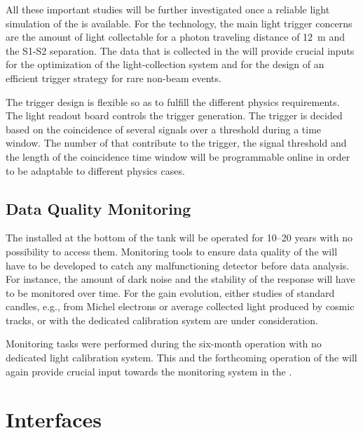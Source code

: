 All these important studies will be further investigated once a reliable light simulation of the  is available. For the \dual  technology, the main light trigger concerns are the amount of light collectable for a photon traveling distance of \SI{12}{m} and the S1-S2 separation. The data that is collected in the  will provide crucial inputs for the optimization of the  light-collection system and for the design of an efficient trigger strategy for rare non-beam events. 

The  trigger design is flexible so as to fulfill the different physics requirements.  %
The light readout  board controls %
the  trigger generation. The trigger is decided based on the coincidence of several  signals over a threshold during a time window. The number of  that contribute to the trigger, the signal threshold and the length of the coincidence time window will be programmable online in order to be adaptable to different physics cases.


\subsection{Data Quality Monitoring}
\label{sec:fddp-pd-7.3}

The  installed at the bottom of the tank will be operated for \numrange{10}{20} years with no possibility to access them. Monitoring tools to ensure data quality of the  will have to be developed to catch any malfunctioning detector before data analysis. For instance, the amount of dark noise and the stability of the  response will have to be monitored over time. For the gain evolution, either studies of standard candles, e.g., from Michel electrons or average collected light produced by cosmic tracks, or with the dedicated calibration system are under consideration.

Monitoring tasks were performed during the six-month  operation with no dedicated light calibration system. This and the forthcoming operation of the  will again provide crucial input towards the  monitoring system in the .

\section{Interfaces}
\label{sec:fddp-pd-8}

